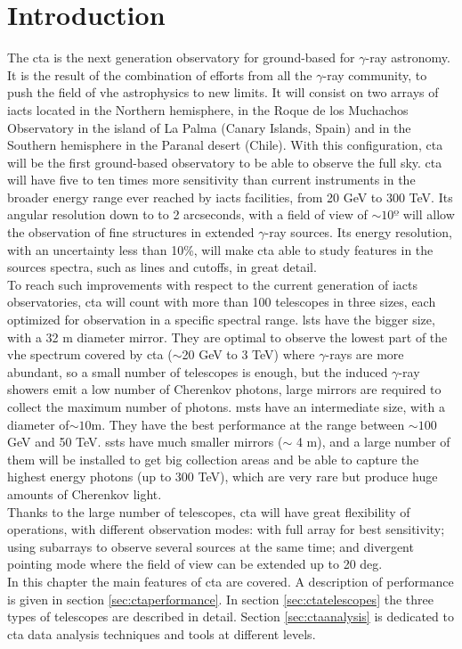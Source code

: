 \documentclass[main.tex]{subfiles}
\begin{document}
\glsresetall

\section{Introduction}

The \gls{cta} \cite{CTA} is the next generation observatory for ground-based for $\gamma$-ray astronomy. It is the result of the combination of efforts from all the $\gamma$-ray community, to push the field of \gls{vhe} astrophysics to new limits. It will consist on two arrays of \glspl{iact} located in the Northern hemisphere, in the Roque de los Muchachos Observatory in the island of La Palma (Canary Islands, Spain) and in the Southern hemisphere in the Paranal desert (Chile). With this configuration, \gls{cta} will be the first ground-based observatory to be able to observe the full sky. \gls{cta} will have five to ten times more sensitivity than current instruments in the broader energy range ever reached by \glspl{iact} facilities, from 20 GeV to 300 TeV. Its angular resolution down to to 2 arcseconds, with a field of view of $\sim 10º$ will allow the observation of fine structures in extended $\gamma$-ray sources. Its energy resolution, with an uncertainty less than 10\%, will make \gls{cta} able to study features in the sources spectra, such as lines and cutoffs, in great detail.\\
To reach such improvements with respect to the current generation of \glspl{iact} observatories, \gls{cta} will count with more than 100 telescopes in three sizes, each optimized for observation in a specific spectral range. \glspl{lst} have the bigger size, with a 32 m diameter mirror. They are optimal to observe the lowest part of the \gls{vhe} spectrum covered by \gls{cta} ($\sim$20 GeV to 3 TeV) where $\gamma$-rays are more abundant, so a small number of telescopes is enough, but the induced $\gamma$-ray showers emit a low number of Cherenkov photons, large mirrors are required to collect the maximum number of photons. \glspl{mst} have an intermediate size, with a diameter of$\sim 10$m. They have the best performance at the range between $\sim 100$ GeV and 50 TeV. \glspl{sst} have much smaller mirrors ($\sim$ 4 m), and a large number of them will be installed to get big collection areas and be able to capture the highest energy photons (up to 300 TeV), which are very rare but produce huge amounts of Cherenkov light.\\
Thanks to the large number of telescopes, \gls{cta} will have great flexibility of operations, with different observation modes: with full array for best sensitivity; using subarrays to observe several sources at the same time; and divergent pointing mode where the field of view can be extended up to 20 deg.\\
In this chapter the main features of \gls{cta} are covered. A description of performance is given in section \ref{sec:ctaperformance}. In section \ref{sec:ctatelescopes} the three types of telescopes are described in detail. Section \ref{sec:ctaanalysis} is dedicated to \gls{cta} data analysis techniques and tools at different levels.
\end{document}
